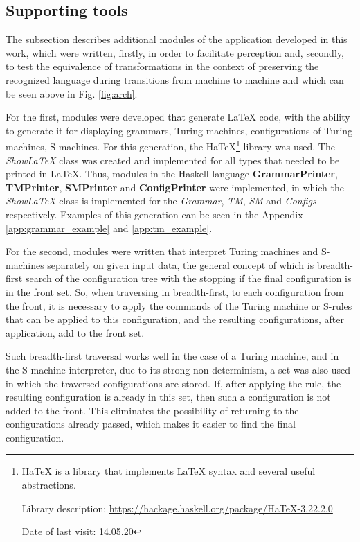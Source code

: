 \documentclass[conference]{IEEEtran}
\theoremstyle{definition}
\begin{document}
\subsection{Supporting tools}

The subsection describes additional modules of the application developed in this work, which were written, firstly, in order to facilitate perception and, secondly, to test the equivalence of transformations in the context of preserving the recognized language during transitions from machine to machine and which can be seen above in Fig. \ref{fig:arch}.

For the first, modules were developed that generate LaTeX code, with the ability to generate it for displaying grammars, Turing machines, configurations of Turing machines, S-machines.
For this generation, the HaTeX\footnote{HaTeX is a library that implements LaTeX syntax and several useful abstractions.

Library description: \url{https://hackage.haskell.org/package/HaTeX-3.22.2.0}

Date of last visit: 14.05.20} library was used. The \textit{ShowLaTeX} class was created and implemented for all types that needed to be printed in LaTeX.
Thus, modules in the Haskell language \textbf{GrammarPrinter}, \textbf{TMPrinter}, \textbf{SMPrinter} and \textbf{ConfigPrinter} were implemented, in which the \textit{ShowLaTeX} class is implemented for the \textit{Grammar}, \textit{TM}, \textit{SM} and \textit{Configs} respectively. Examples of this generation can be seen in the Appendix \ref{app:grammar_example} and \ref{app:tm_example}.

For the second, modules were written that interpret Turing machines and S-machines separately on given input data, the general concept of which is breadth-first search of the configuration tree with the stopping if the final configuration is in the front set. So, when traversing in breadth-first, to each configuration from the front, it is necessary to apply the commands of the Turing machine or S-rules that can be applied to this configuration, and the resulting configurations, after application, add to the front set.

Such breadth-first traversal works well in the case of a Turing machine, and in the S-machine interpreter, due to its strong non-determinism, a set was also used in which the traversed configurations are stored. If, after applying the rule, the resulting configuration is already in this set, then such a configuration is not added to the front. This eliminates the possibility of returning to the configurations already passed, which makes it easier to find the final configuration.
\end{document}
